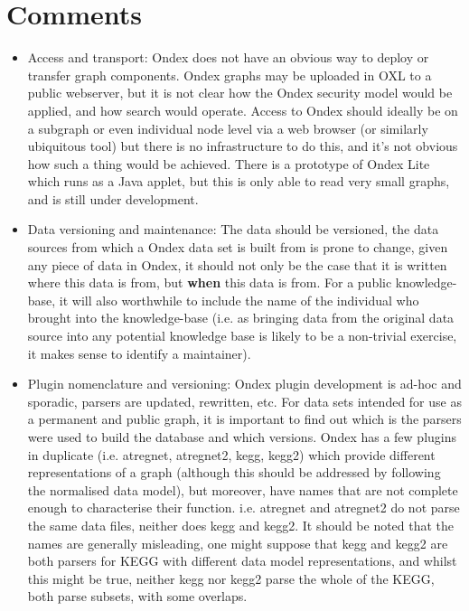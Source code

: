 \documentclass[a4paper,10pt]{article}
\newcommand{\nl}{\vskip 0.5cm \noindent}
\begin{document}
\section{Comments}
\begin{itemize}
\item Access and transport: Ondex does not have an obvious way to deploy or transfer graph components. Ondex graphs may be uploaded in OXL to a public webserver, but it is not clear how the Ondex security model would be applied, and how search would operate. Access to Ondex should ideally be on a subgraph or even individual node level via a web browser (or similarly ubiquitous tool) but there is no infrastructure to do this, and it's not obvious how such a thing would be achieved. There is a prototype of Ondex Lite which runs as a Java applet, but this is only able to read very small graphs, and is still under development.

\nl
\item Data versioning and maintenance: The data should be versioned, the data sources from which a Ondex data set is built from is prone to change, given any piece of data in Ondex, it should not only be the case that it is written where this data is from, but \textbf{when} this data is from. For a public knowledge-base, it will also worthwhile to include the name of the individual who brought into the knowledge-base (i.e. as bringing data from the original data source into any potential knowledge base is likely to be a non-trivial exercise, it makes sense to identify a maintainer).

\nl
\item Plugin nomenclature and versioning: Ondex plugin development is ad-hoc and sporadic, parsers are updated, rewritten, etc. For data sets intended for use as a permanent and public graph, it is important to find out which is the parsers were used to build the database and which versions. Ondex has a few plugins in duplicate (i.e. atregnet, atregnet2, kegg, kegg2) which provide different representations of a graph (although this should be addressed by following the normalised data model), but moreover, have names that are not complete enough to characterise their function. i.e. atregnet and atregnet2 do not parse the same data files, neither does kegg and kegg2. It should be noted that the names are generally misleading, one might suppose that kegg and kegg2 are both parsers for KEGG with different data model representations, and whilst this might be true, neither kegg nor kegg2 parse the whole of the KEGG, both parse subsets, with some overlaps.


\end{itemize}
\end{document}
